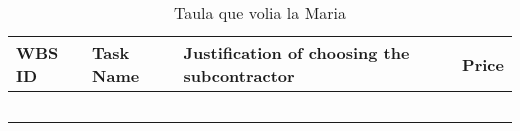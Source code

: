 \begin{longtable}[H]{p{1.9cm} p{3.5cm} p{5.7cm} p{2cm}}
	\toprule[2pt]
	
	\textbf{WBS ID} & \textbf{Task Name} & \textbf{Justification of choosing the subcontractor} & \textbf{Price} \\
	
	\midrule[1.5pt] 
	\endhead
	
	&  &  &  \vspace{0.2cm} \\
	
	\midrule
	
	&  &  &  \vspace{0.2cm} \\
	
	\midrule
	
	&  &  &  \vspace{0.2cm} \\
	
	\midrule
	
	&  &  &  \vspace{0.2cm} \\
	
	\bottomrule[2pt]
	
	\caption{Taula que volia la Maria}
	\label{MariaTable}
\end{longtable}